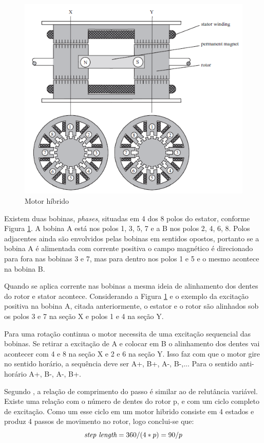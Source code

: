 \begin{figure}[htp]
	\centering
	\includegraphics[scale=0.7]{images/hibrido.png}
	\caption{Motor híbrido}	
	\label{fig:hibrido}	
\end{figure}

Existem duas bobinas, \emph{phases}, situadas em 4 dos 8 polos do estator, conforme Figura \ref{fig:hibrido}. A bobina A está nos polos 1, 3, 5, 7 e a B nos polos 2, 4, 6, 8. Polos adjacentes ainda são envolvidos pelas bobinas em sentidos opostos, portanto se a bobina A é alimentada com corrente positiva o campo magnético é direcionado para fora nas bobinas 3 e 7, mas para dentro nos polos 1 e 5 e o mesmo acontece na bobina B.

Quando se aplica corrente nas bobinas a mesma ideia de alinhamento dos dentes do rotor e stator acontece. Considerando a Figura \ref{fig:hibrido} e o exemplo da excitação positiva na bobina A, citada anteriormente, o estator e o rotor são alinhados sob os polos 3 e 7 na seção X e polos 1 e 4 na seção Y.

Para uma rotação continua o motor necessita de uma excitação sequencial das bobinas. Se retirar a excitação de A e colocar em B o alinhamento dos dentes vai acontecer com 4 e 8 na seção X e 2 e 6 na seção Y. Isso faz com que o motor gire no sentido horário, a sequência deve ser A+, B+, A-, B-,... Para o sentido anti-horário A+, B-, A-, B+.

Segundo \cite{acarnley2002stepping}, a relação de comprimento do passo é similar ao de relutância variável. Existe uma relação com o número de dentes do rotor p, e com um ciclo completo de excitação. Como um esse ciclo em um motor hibrido consiste em 4 estados e produz 4 passos de movimento no rotor, logo conclui-se que:
\begin{equation}
  \emph{step length} = 360/(4 * p) = 90 / p
\end{equation}

